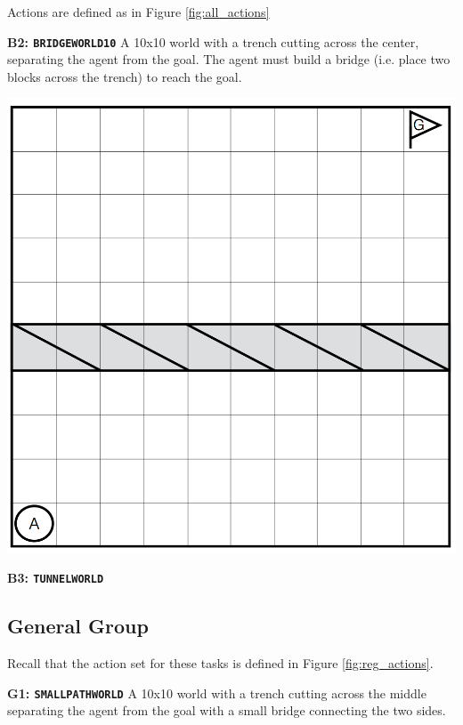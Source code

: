 \documentclass[]{article}
\begin{document}
Actions are defined as in Figure \ref{fig:all_actions}
	
{\bf B2: \texttt{BRIDGEWORLD10}} A 10x10 world with a trench cutting across the center, separating the agent from the goal. The agent must build a bridge (i.e. place two blocks across the trench) to reach the goal.

\begin{center}
\includegraphics[scale=0.28]{figures/bridgeworld10.png}
\end{center}

{\bf B3: \texttt{TUNNELWORLD}}



\subsection{General Group}

Recall that the action set for these tasks is defined in Figure \ref{fig:reg_actions}.

{\bf G1: \texttt{SMALLPATHWORLD}} A 10x10 world with a trench cutting across the middle separating the agent from the goal with a small bridge connecting the two sides.
\end{document}
